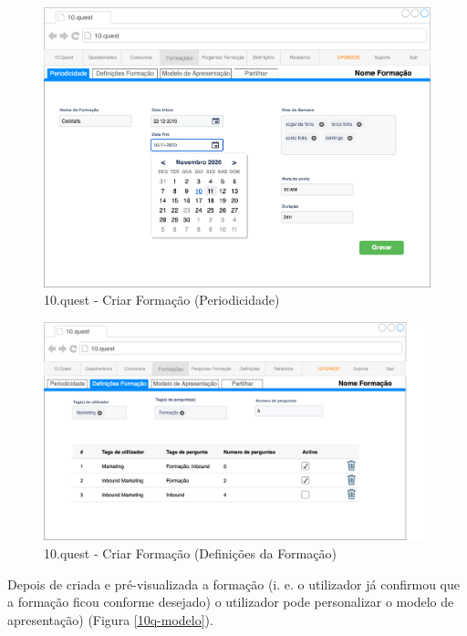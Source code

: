 \newpage

\begin{figure}[ht!]
	\begin{center}
		\includegraphics[width=1\textwidth]{img/prototipos/9.png}
		\caption{10.quest - Criar Formação (Periodicidade)}
		\label{10q-periodo}
	\end{center}
\end{figure}

\begin{figure}[ht!]
	\begin{center}
		\includegraphics[width=1\textwidth]{img/prototipos/10.png}
		\caption{10.quest - Criar Formação (Definições da Formação)}
		\label{10q-entradas}
	\end{center}
\end{figure}
\newpage

Depois de criada e pré-visualizada a formação (i. e. o utilizador já confirmou que a formação ficou conforme desejado) o utilizador pode personalizar o modelo de apresentação) (Figura \ref{10q-modelo}).


